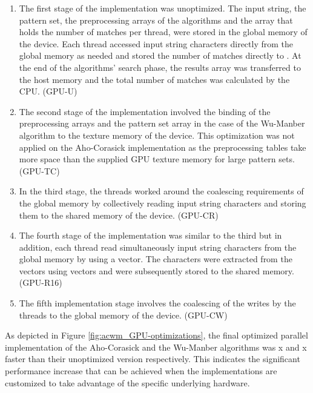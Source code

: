 \documentclass{ws-ijait}
\begin{document}
\begin{enumerate}
	
	\item The first stage of the implementation was unoptimized. The input string, the pattern set, the preprocessing arrays of the algorithms and the  array that holds the number of matches per thread, were stored in the global memory of the device. Each thread accessed input string characters directly from the global memory as needed and stored the number of matches directly to . At the end of the algorithms' search phase, the results array was transferred to the host memory and the total number of matches was calculated by the CPU. (GPU-U)
	
	\item The second stage of the implementation involved the binding of the preprocessing arrays and the pattern set array in the case of the Wu-Manber algorithm to the texture memory of the device. This optimization was not applied on the Aho-Corasick implementation as the preprocessing tables take more space than the supplied GPU texture memory for large pattern sets. (GPU-TC)
	
	\item In the third stage, the threads worked around the coalescing requirements of the global memory by collectively reading input string characters and storing them to the shared memory of the device. (GPU-CR)
	
	\item The fourth stage of the implementation was similar to the third but in addition, each thread read simultaneously  input string characters from the global memory by using a  vector. The characters were extracted from the vectors using  vectors and were subsequently stored to the shared memory. (GPU-R16)
	
	\item The fifth implementation stage involves the coalescing of the writes by the threads to the global memory of the device. (GPU-CW)
	
\end{enumerate}

As depicted in Figure \ref{fig:acwm_GPU-optimizations}, the final optimized parallel implementation of the Aho-Corasick and the Wu-Manber algorithms was x and x faster than their unoptimized version respectively. This indicates the significant performance increase that can be achieved when the implementations are customized to take advantage of the specific underlying hardware.
\end{document}
